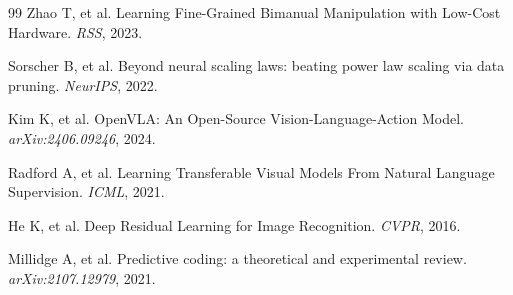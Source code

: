 \documentclass[12pt,a4paper]{article}
\begin{document}
\begin{thebibliography}{99}
Zhao T, et al. Learning Fine-Grained Bimanual Manipulation with Low-Cost Hardware. \textit{RSS}, 2023.

Sorscher B, et al. Beyond neural scaling laws: beating power law scaling via data pruning. \textit{NeurIPS}, 2022.

Kim K, et al. OpenVLA: An Open-Source Vision-Language-Action Model. \textit{arXiv:2406.09246}, 2024.

Radford A, et al. Learning Transferable Visual Models From Natural Language Supervision. \textit{ICML}, 2021.

He K, et al. Deep Residual Learning for Image Recognition. \textit{CVPR}, 2016.

Millidge A, et al. Predictive coding: a theoretical and experimental review. \textit{arXiv:2107.12979}, 2021.
\end{thebibliography}
\end{document}
